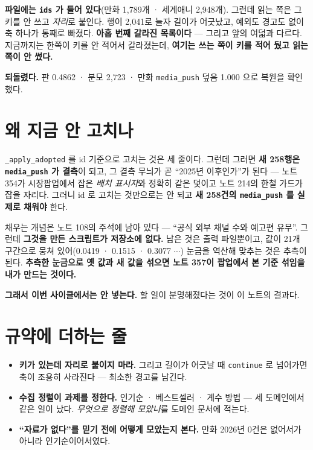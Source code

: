 \documentclass[11pt]{article}
\begin{document}
\textbf{파일에는 \texttt{ids} 가 들어 있다}(만화 1,789개 · 세계애니
2,948개). 그런데 읽는 쪽은 그 키를 안 쓰고 \emph{자리}로 붙인다. 행이
2,041로 늘자 길이가 어긋났고, 예외도 경고도 없이 축 하나가 통째로
빠졌다. \textbf{아홉 번째 갈라진 목록이다} --- 그리고 앞의 여덟과 다르다.
지금까지는 한쪽이 키를 안 적어서 갈라졌는데, \textbf{여기는 쓰는 쪽이
키를 적어 뒀고 읽는 쪽이 안 썼다.}

\textbf{되돌렸다.} 판 0.4862 · 분모 2,723 · 만화 \texttt{media\_push}
덮음 1.000 으로 복원을 확인했다.

\section{왜 지금 안 고치나}

\texttt{\_apply\_adopted} 를 id 기준으로 고치는 것은 세 줄이다. 그런데
그러면 \textbf{새 258행은 \texttt{media\_push} 가 결측}이 되고, 그 결측
무늬가 곧 ``2025년 이후인가''가 된다 --- 노트 354가 시장팝업에서 잡은
\emph{배치 표시자}와 정확히 같은 덫이고 노트 214의 한철 가드가 잡을
자리다. 그러니 id 로 고치는 것만으로는 안 되고 \textbf{새 258건의
\texttt{media\_push} 를 실제로 채워야} 한다.

채우는 개념은 노트 108의 주석에 남아 있다 --- ``공식 외부 채널 수와
예고편 유무''. 그런데 \textbf{그것을 만든 스크립트가 저장소에 없다.}
남은 것은 출력 파일뿐이고, 값이 21개 구간으로 뭉쳐 있어(0.0419 · 0.1515 ·
0.3077 $\cdots$) 눈금을 역산해 맞추는 것은 추측이 된다. \textbf{추측한
눈금으로 옛 값과 새 값을 섞으면 노트 357이 팝업에서 본 기준 섞임을 내가
만드는 것이다.}

\textbf{그래서 이번 사이클에서는 안 넣는다.} 할 일이 분명해졌다는 것이
이 노트의 결과다.

\section{규약에 더하는 줄}

\begin{itemize}
\item \textbf{키가 있는데 자리로 붙이지 마라.} 그리고 길이가 어긋날 때
\texttt{continue} 로 넘어가면 축이 조용히 사라진다 --- 최소한 경고를
남긴다.
\item \textbf{수집 정렬이 과제를 정한다.} 인기순 · 베스트셀러 · 계수 방법
--- 세 도메인에서 같은 일이 났다. \emph{무엇으로 정렬해 모았나}를 도메인
문서에 적는다.
\item \textbf{``자료가 없다''를 믿기 전에 어떻게 모았는지 본다.} 만화
2026년 0건은 없어서가 아니라 인기순이어서였다.
\end{itemize}
\end{document}
